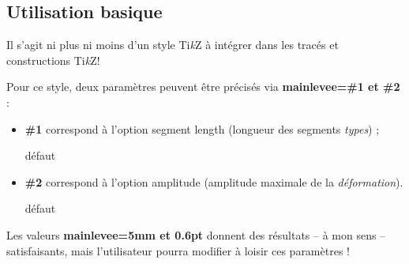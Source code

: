\documentclass[french,a4paper,11pt]{article}
\providecommand\tikzlogo{Ti\textit{k}Z}
\let\TikZ\tikzlogo
\newcommand\Cle[1]{{\bfseries\sffamily\textlangle #1\textrangle}}
\begin{document}
\begin{DemoCode}
\end{DemoCode}

\subsection{Utilisation basique}

\begin{cautionblock}
Il s'agit ni plus ni moins d'un style \TikZ{} à intégrer dans les tracés et constructions \TikZ !

\smallskip

Pour ce style, deux paramètres peuvent être précisés via \Cle{mainlevee=\#1 et \#2} :

\begin{itemize}
	\item \Cle{\#1} correspond à l'option \textsf{segment length} (longueur des segments \textit{types}) ;
	
	\hfill{}défaut \Cle{5mm}
	\item \Cle{\#2} correspond à l'option \textsf{amplitude} (amplitude maximale de la \textit{déformation}).
	
	\hfill{}défaut \Cle{0.6pt}
\end{itemize}

Les valeurs \Cle{mainlevee=5mm et 0.6pt} donnent des résultats -- à mon sens -- satisfaisants, mais l'utilisateur pourra modifier à loisir ces paramètres !
\end{cautionblock}

\begin{DemoCode}


\end{DemoCode}
\end{document}
